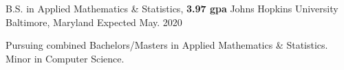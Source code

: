 

\begin{cventries}

  \cventry
    {B.S. in Applied Mathematics \& Statistics, \textbf{3.97 gpa}} %
    {Johns Hopkins University} %
    {Baltimore, Maryland} %
    {Expected May. 2020} %
    {
      \begin{cvitems}
        \item {Pursuing combined Bachelors/Masters in Applied Mathematics \& Statistics. Minor in Computer Science.}
      \end{cvitems}
    }

\end{cventries}